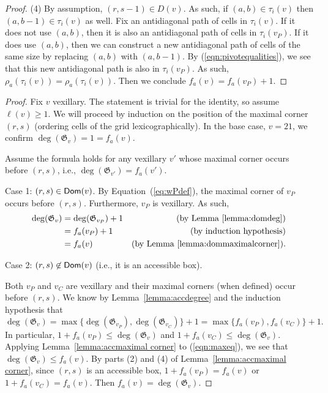 \documentclass[12pt]{amsart}
\theoremstyle{definition}
\theoremstyle{remark}
\numberwithin{equation}{section}
\newcommand{\maxsizeantidiag}{\rho_a}
\newcommand{\antidiagstat}{f_a}
\begin{document}
\begin{proof}
\noindent (4) By assumption, $(r,s-1)\in D(v)$.  As such, if $(a,b)\in \tau_i(v)$ then $(a,b-1)\in \tau_i(v)$ as well.  Fix an antidiagonal path of cells in $\tau_i(v)$.  If it does not use $(a,b)$, then it is also an antidiagonal path of cells in $\tau_i(v_P)$.  If it does use $(a,b)$, then we can construct a new antidiagonal path of cells of the same size by replacing $(a,b)$ with $(a,b-1)$.  By (\ref{eqn:pivotequalities}), we see that this new antidiagonal path is also in $\tau_i(v_P)$.  As such, $\maxsizeantidiag(\tau_i(v))=\maxsizeantidiag(\tau_i(v))$.
Then we conclude $\antidiagstat(v)=\antidiagstat(v_P)+1$.
\end{proof}






\begin{proof}
Fix $v$ vexillary.  The statement is trivial for the identity, so assume $\ell(v)\geq 1$.  We will proceed by induction on the position of the maximal corner $(r,s)$ (ordering cells of the grid lexicographically).   In the base case, $v=21$, we confirm $\deg(\mathfrak G_v)=1=\antidiagstat(v)$.

  Assume the formula holds for any vexillary $v'$ whose maximal corner occurs before $(r,s)$, i.e., $\deg(\mathfrak G_{v'})=\antidiagstat(v')$.

\noindent Case 1: $(r,s)\in{\sf Dom}(v)$.
By Equation~(\ref{eq:wPdef}), the maximal corner of $v_P$ occurs before $(r,s)$.  Furthermore, $v_P$ is vexillary.  As such, 
\begin{align*}
\deg(\mathfrak G_v)&=\deg(\mathfrak G_{v_P})+1 &\text{(by Lemma~\ref{lemma:domdeg})}\\
&=\antidiagstat(v_P)+1 &\text{(by induction hypothesis)}\\
&=\antidiagstat(v) &\text{(by Lemma~\ref{lemma:dommaximalcorner})}.
\end{align*}



\noindent Case 2: $(r,s)\not\in{\sf Dom}(v)$ (i.e., it is an accessible box).

Both $v_P$ and $v_C$ are vexillary and their maximal corners (when defined) occur before $(r,s)$.
We know by Lemma~\ref{lemma:accdegree} and the induction hypothesis that 
\begin{equation}
\label{eqn:maxeq}
\deg(\mathfrak G_v)=\max\{\deg(\mathfrak G_{v_P}),\deg(\mathfrak G_{v_C})\}+1=\max\{\antidiagstat(v_P),\antidiagstat(v_C)\}+1.
\end{equation}
In particular, $1+\antidiagstat(v_P)\leq \deg(\mathfrak G_v)$ and $1+\antidiagstat(v_C)\leq \deg(\mathfrak G_v)$. Applying Lemma~\ref{lemma:accmaximal corner} to (\ref{eqn:maxeq}), we see that $\deg(\mathfrak G_v)\leq \antidiagstat(v)$.  
By parts (2) and (4) of Lemma~\ref{lemma:accmaximal corner}, since $(r,s)$ is an accessible box, $1+\antidiagstat(v_P)=\antidiagstat(v)$ or $1+\antidiagstat(v_C)=\antidiagstat(v)$. Then $\antidiagstat(v)=\deg(\mathfrak G_v)$.
\end{proof}	
\end{document}
